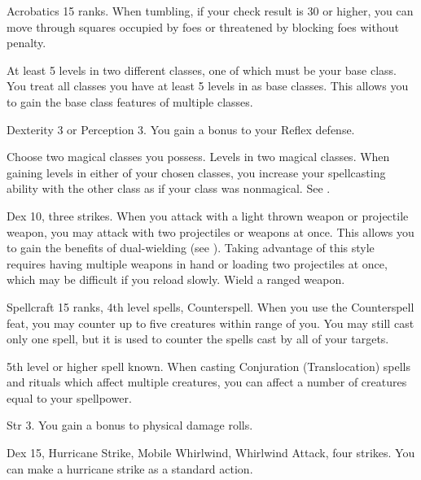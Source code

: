 \featpre Acrobatics 15 ranks.
\featben When tumbling, if your check result is 30 or higher, you can move through squares occupied by foes or threatened by blocking foes without penalty.

\featpre At least 5 levels in two different classes, one of which must be your base class.
\featben You treat all classes you have at least 5 levels in as base classes.
This allows you to gain the base class features of multiple classes.

\featpre Dexterity 3 or Perception 3.
\featben You gain a  bonus to your Reflex defense.

Choose two magical classes you possess.
\featpres
Levels in two magical classes.
\featben When gaining levels in either of your chosen classes, you increase your spellcasting ability with the other class as if your class was nonmagical.
See .

\featpres Dex 10, three strikes.
\featben When you attack with a light thrown weapon or projectile weapon, you may attack with two projectiles or weapons at once.
This allows you to gain the benefits of dual-wielding (see ).
Taking advantage of this style requires having multiple weapons in hand or loading two projectiles at once, which may be difficult if you reload slowly.
\stylereq Wield a ranged weapon.

\featpres Spellcraft 15 ranks, 4th level spells, Counterspell.
\featben When you use the Counterspell feat, you may counter up to five creatures within \rngmed range of you.
You may still cast only one spell, but it is used to counter the spells cast by all of your targets.

\featpre 5th level or higher  spell known.
\featben When casting Conjuration (Translocation) spells and rituals which affect multiple creatures, you can affect a number of creatures equal to your spellpower.

\featpres Str 3.
\featben You gain a  bonus to physical damage rolls.

\featpres Dex 15, Hurricane Strike, Mobile Whirlwind, Whirlwind Attack, four strikes.
\featben You can make a hurricane strike as a standard action.

